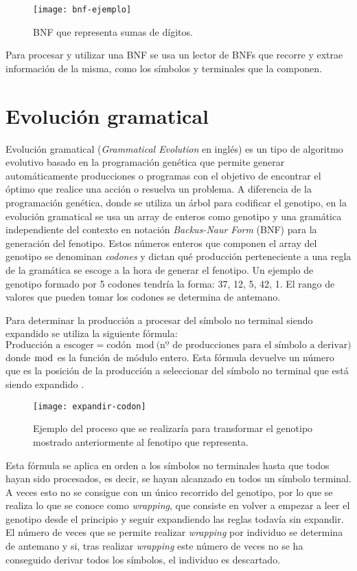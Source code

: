 \begin{figure}[H]
\centering
\texttt{[image: bnf-ejemplo]}
\caption{BNF que representa sumas de dígitos.}
\end{figure}

Para procesar y utilizar una BNF se usa un lector de BNFs que recorre y extrae información de la misma, como los símbolos y terminales que la componen.

\section{Evolución gramatical}
Evolución gramatical (\textit{Grammatical Evolution} en inglés) es un tipo de algoritmo evolutivo basado en la programación genética que permite generar automáticamente producciones o programas  con el objetivo de encontrar el óptimo que realice una acción o resuelva un problema. A diferencia de la programación genética, donde se utiliza un árbol para codificar el genotipo, en la evolución gramatical se usa un array de enteros como genotipo y una gramática independiente del contexto en notación \textit{Backus-Naur Form} (BNF) para la generación del fenotipo. Estos números enteros que componen el array del genotipo se denominan \textit{codones} y dictan qué producción perteneciente a una regla de la gramática se escoge a la hora de generar el fenotipo. Un ejemplo de genotipo formado por 5 codones tendría la forma: 37, 12, 5, 42, 1. El rango de valores que pueden tomar los codones se determina de antemano.

Para determinar la producción a procesar del símbolo no terminal siendo expandido se utiliza la siguiente fórmula:
\begin{equation}
\textrm{Producción a escoger} = \textrm{codón} \bmod \textrm{(nº de producciones para el símbolo a derivar)}
\end{equation}
donde $\bmod$ es la función de módulo entero. Esta fórmula devuelve un número que es la posición de la producción a seleccionar del símbolo no terminal que está siendo expandido \cite{o2012grammatical}.

\begin{figure}[H]
\centering
\texttt{[image: expandir-codon]}
\caption{Ejemplo del proceso que se realizaría para transformar el genotipo mostrado anteriormente al fenotipo que representa.}
\end{figure}

Esta fórmula se aplica en orden a los símbolos no terminales hasta que todos hayan sido procesados, es decir, se hayan alcanzado en todos un símbolo terminal. A veces esto no se consigue con un único recorrido del genotipo, por lo que se realiza lo que se conoce como \textit{wrapping}, que consiste en  volver a empezar a leer el genotipo desde el principio y seguir expandiendo las reglas todavía sin expandir. El número de veces que se permite realizar \textit{wrapping} por individuo se determina de antemano y si, tras realizar \textit{wrapping} este número de veces no se ha conseguido derivar todos los símbolos, el individuo es descartado.

